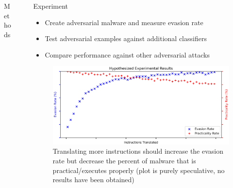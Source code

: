 \documentclass[final,10pt]{beamer}
\newlength{\sepwidth}
\newlength{\colwidth}
\newcommand{\separatorcolumn}{\begin{column}{\sepwidth}\end{column}}
\begin{document}
\begin{frame}[t]
\begin{columns}[t]
\begin{column}{\colwidth}
\begin{block}{Methods}
	\end{block}

\end{column}

\separatorcolumn

\begin{column}{\colwidth}

	\begin{block}{Experiment}
		
		
		\begin{itemize}
			\item Create adversarial malware and measure evasion rate
			\item Test adversarial examples against additional classifiers
			\item Compare performance against other adversarial attacks
		\end{itemize}
	
		\begin{figure}
			\begin{center}
				\includegraphics[scale=.95]{./figures/Evasion_Rate.png}
			\end{center}
			\caption{Translating more instructions should increase the evasion rate but decrease the percent of malware that is practical/executes properly (plot is purely speculative, no results have been obtained)}
			\label{fig:EvasionRate}
		\end{figure}
		

\end{block}
\end{column}
\end{columns}
\end{frame}
\end{document}

